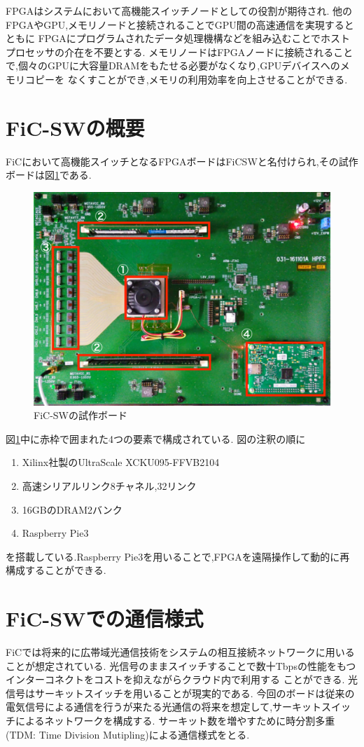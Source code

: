 {  FPGAはシステムにおいて高機能スイッチノードとしての役割が期待され.
  他のFPGAやGPU,メモリノードと接続されることでGPU間の高速通信を実現するとともに
  FPGAにプログラムされたデータ処理機構などを組み込むことでホストプロセッサの介在を不要とする.
  メモリノードはFPGAノードに接続されることで,個々のGPUに大容量DRAMをもたせる必要がなくなり,GPUデバイスへのメモリコピーを
  なくすことができ,メモリの利用効率を向上させることができる.
  
  \section{FiC-SWの概要}
  \label{sec:about_ficsw}
  FiCにおいて高機能スイッチとなるFPGAボードはFiCSWと名付けられ,その試作ボードは図\ref{fig:ficsw}である.
  
  \begin{figure}[h]
    \centering
    \includegraphics[width=12cm]{./chap3/fig/ficsw.pdf}
    \caption{FiC-SWの試作ボード}
    \label{fig:ficsw}
  \end{figure}
  
  図\ref{fig:ficsw}中に赤枠で囲まれた4つの要素で構成されている.
  図の注釈の順に
  \begin{enumerate}
    \item Xilinx社製のUltraScale XCKU095-FFVB2104
    \item 高速シリアルリンク8チャネル,32リンク
    \item 16GBのDRAM2バンク
    \item Raspberry Pie3
  \end{enumerate}
  を搭載している.Raspberry Pie3を用いることで,FPGAを遠隔操作して動的に再構成することができる.
  
  \section{FiC-SWでの通信様式}
  \label{sec:ficsw_communication}
  FiCでは将来的に広帯域光通信技術をシステムの相互接続ネットワークに用いることが想定されている.
  光信号のままスイッチすることで数十Tbpsの性能をもつインターコネクトをコストを抑えながらクラウド内で利用する
  ことができる.
  光信号はサーキットスイッチを用いることが現実的である.
  今回のボードは従来の電気信号による通信を行うが来たる光通信の将来を想定して,サーキットスイッチによるネットワークを構成する.
  サーキット数を増やすために時分割多重(TDM: Time Division Mutipling)による通信様式をとる.
  
}
